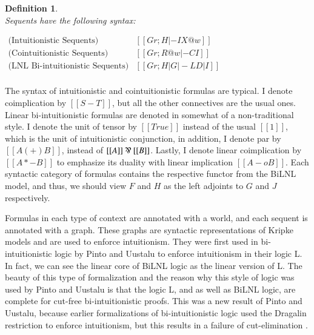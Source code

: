 \documentclass{lmcs}
\newtheorem{definition}[theorem]{Definition}
\begin{document}
\begin{definition}
  \ \\
  \noindent
  Sequents have the following syntax:
  \begin{center}
    \begin{math}
      \begin{array}{rll}
        \text{(Intuitionistic Sequents)}   & [[Gr;H |-I X@w]]\\
        \text{(Cointuitionistic Sequents)} & [[Gr;R@w |-C I]]\\
        \text{(LNL Bi-intuitionistic Sequents)} & [[Gr;H | G |-L D | I]]\\
      \end{array}
    \end{math}
  \end{center}
\end{definition}

The syntax of intuitionistic and cointuitionistic formulas are
typical.  I denote coimplication by $[[S - T]]$, but all the other
connectives are the usual ones. Linear bi-intuitionistic formulas are
denoted in somewhat of a non-traditional style. I denote the unit of
tensor by $[[True]]$ instead of the usual $[[1]]$, which is the unit
of intuitionistic conjunction, in addition, I denote par by $[[A (+)
    B]]$, instead of $[[A]] \parr [[B]]$.  Lastly, I denote linear
coimplication by $[[A *- B]]$ to emphasize its duality with linear
implication $[[A -o B]]$.  Each syntactic category of formulas
contains the respective functor from the BiLNL model, and thus, we
should view $F$ and $H$ as the left adjoints to $G$ and $J$
respectively.

Formulas in each type of context are annotated with a world, and each
sequent is annotated with a graph.  These graphs are syntactic
representations of Kripke models and are used to enforce intuitionism.
They were first used in bi-intuitionistic logic by Pinto and Uustalu
\cite{Pinto:2009} to enforce intuitionism in their logic L.  In fact,
we can see the linear core of BiLNL logic as the linear version of L.
The beauty of this type of formalization and the reason why this style
of logic was used by Pinto and Uustalu is that the logic L, and as
well as BiLNL logic, are complete for cut-free bi-intuitionistic
proofs.  This was a new result of Pinto and Uustalu, because earlier
formalizations of bi-intuitionistic logic \cite{Crolard:2001} used the
Dragalin restriction \cite{Dragalin:1988} to enforce intuitionism, but
this results in a failure of cut-elimination
\cite{Schellinx:1991,Pinto:2009}.
\end{document}
